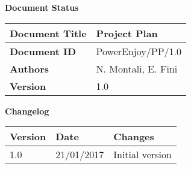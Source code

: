\textbf{\Huge Document Status}
\begin{center}
    \begin{tabular}{ | l | p{10cm} |}
    \hline
    \textbf{Document Title} & Project Plan \\ \hline
    \textbf{Document ID} & PowerEnjoy/PP/1.0 \\ \hline
    \textbf{Authors} & N. Montali, E. Fini \\ \hline
    \textbf{Version} & 1.0 \\ \hline
    \end{tabular}
\textbf{\Large Changelog}
     \begin{tabular}{ | l | l | p{10cm} |}
    \hline
    \textbf{Version} & \textbf{Date} & \textbf{Changes} \\ \hline
    1.0 & 21/01/2017 & Initial version \\ \hline
    \end{tabular}
\end{center}